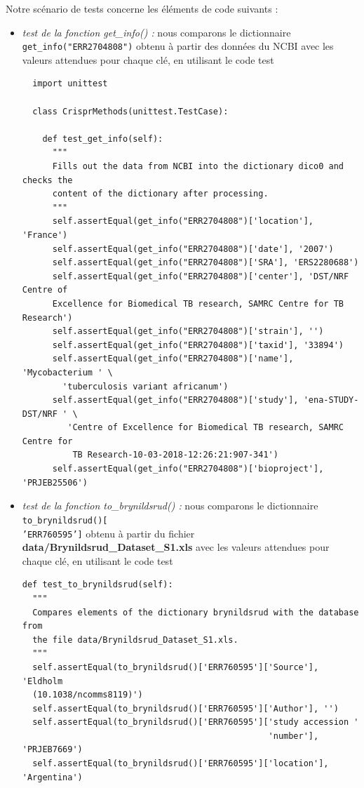 \documentclass[twoside,a4paper,11pt,frenchb,openany]{report}
\begin{document}
Notre scénario de tests concerne les éléments de code suivants :

\begin{itemize}
\item \textit{test de la fonction get\_info() :} nous comparons le dictionnaire \texttt{get\_info("ERR2704808")} obtenu à partir des données du NCBI avec les valeurs attendues pour chaque clé, en utilisant le code test
\begin{verbatim}
  import unittest
  
  class CrisprMethods(unittest.TestCase):

    def test_get_info(self):
      """
      Fills out the data from NCBI into the dictionary dico0 and checks the 
      content of the dictionary after processing.
      """
      self.assertEqual(get_info("ERR2704808")['location'], 'France')
      self.assertEqual(get_info("ERR2704808")['date'], '2007')
      self.assertEqual(get_info("ERR2704808")['SRA'], 'ERS2280688')
      self.assertEqual(get_info("ERR2704808")['center'], 'DST/NRF Centre of 
      Excellence for Biomedical TB research, SAMRC Centre for TB Research')
      self.assertEqual(get_info("ERR2704808")['strain'], '')
      self.assertEqual(get_info("ERR2704808")['taxid'], '33894')
      self.assertEqual(get_info("ERR2704808")['name'], 'Mycobacterium ' \
        'tuberculosis variant africanum')
      self.assertEqual(get_info("ERR2704808")['study'], 'ena-STUDY-DST/NRF ' \
         'Centre of Excellence for Biomedical TB research, SAMRC Centre for 
          TB Research-10-03-2018-12:26:21:907-341')
      self.assertEqual(get_info("ERR2704808")['bioproject'], 'PRJEB25506')
\end{verbatim}
\item \textit{test de la fonction to\_brynildsrud() :} nous comparons le dictionnaire \texttt{to\_brynildsrud()[\\'ERR760595']} obtenu à partir du fichier \textbf{data/Brynildsrud\_Dataset\_S1.xls} avec les valeurs attendues pour chaque clé, en utilisant le code test
\begin{verbatim}
def test_to_brynildsrud(self):
  """
  Compares elements of the dictionary brynildsrud with the database from
  the file data/Brynildsrud_Dataset_S1.xls.
  """
  self.assertEqual(to_brynildsrud()['ERR760595']['Source'], 'Eldholm 
  (10.1038/ncomms8119)')
  self.assertEqual(to_brynildsrud()['ERR760595']['Author'], '')
  self.assertEqual(to_brynildsrud()['ERR760595']['study accession '
                                                 'number'], 'PRJEB7669')
  self.assertEqual(to_brynildsrud()['ERR760595']['location'], 'Argentina')

\end{verbatim}
\end{itemize}
\end{document}
